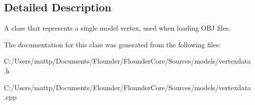 \subsection{Detailed Description}
A class that represents a single model vertex, used when loading O\+BJ files. 



The documentation for this class was generated from the following files\+:\begin{DoxyCompactItemize}
\item 
C\+:/\+Users/mattp/\+Documents/\+Flounder/\+Flounder\+Core/\+Sources/models/vertexdata.\+h\item 
C\+:/\+Users/mattp/\+Documents/\+Flounder/\+Flounder\+Core/\+Sources/models/vertexdata.\+cpp\end{DoxyCompactItemize}
